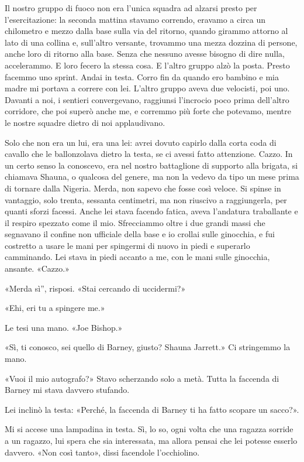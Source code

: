 Il nostro gruppo di fuoco non era l'unica squadra ad alzarsi presto per
l'esercitazione: la seconda mattina stavamo correndo, eravamo a circa un
chilometro e mezzo dalla base sulla via del ritorno, quando girammo
attorno al lato di una collina e, sull'altro versante, trovammo una
mezza dozzina di persone, anche loro di ritorno alla base. Senza che
nessuno avesse bisogno di dire nulla, accelerammo. E loro fecero la
stessa cosa. E l'altro gruppo alzò la posta. Presto facemmo uno sprint.
Andai in testa. Corro fin da quando ero bambino e mia madre mi portava a
correre con lei. L'altro gruppo aveva due velocisti, poi uno. Davanti a
noi, i sentieri convergevano, raggiunsi l'incrocio poco prima dell'altro
corridore, che poi superò anche me, e corremmo più forte che potevamo,
mentre le nostre squadre dietro di noi applaudivano.

Solo che non era un lui, era una lei: avrei dovuto capirlo dalla corta
coda di cavallo che le ballonzolava dietro la testa, se ci avessi fatto
attenzione. Cazzo. In un certo senso la conoscevo, era nel nostro
battaglione di supporto alla brigata, si chiamava Shauna, o qualcosa del
genere, ma non la vedevo da tipo un mese prima di tornare dalla Nigeria.
Merda, non sapevo che fosse così veloce. Si spinse in vantaggio, solo
trenta, sessanta centimetri, ma non riuscivo a raggiungerla, per quanti
sforzi facessi. Anche lei stava facendo fatica, aveva l'andatura
traballante e il respiro spezzato come il mio. Sfrecciammo oltre i due
grandi massi che segnavano il confine non ufficiale della base e io
crollai sulle ginocchia, e fui costretto a usare le mani per spingermi
di nuovo in piedi e superarlo camminando. Lei stava in piedi accanto a
me, con le mani sulle ginocchia, ansante. «Cazzo.»

«Merda sì'', risposi. «Stai cercando di uccidermi?»

«Ehi, eri tu a spingere me.»

Le tesi una mano. «Joe Bishop.»

«Sì, ti conosco, sei quello di Barney, giusto? Shauna Jarrett.» Ci
stringemmo la mano.

«Vuoi il mio autografo?» Stavo scherzando solo a metà. Tutta la faccenda
di Barney mi stava davvero stufando.

Lei inclinò la testa: «Perché, la faccenda di Barney ti ha fatto scopare
un sacco?».

Mi si accese una lampadina in testa. Sì, lo so, ogni volta che una
ragazza sorride a un ragazzo, lui spera che sia interessata, ma allora
pensai che lei potesse esserlo davvero. «Non così tanto», dissi
facendole l'occhiolino.

